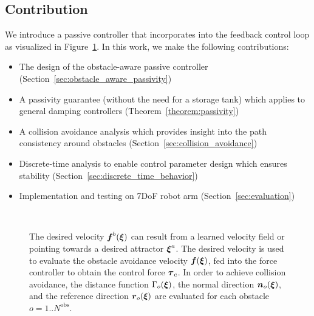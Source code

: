 \subsection{Contribution}
We introduce a passive controller that incorporates into the feedback control loop as visualized in Figure~\ref{fig:control_scheme_passive}. 
In this work, we make the following contributions:
\begin{itemize}
\item The design of the obstacle-aware passive controller
(Section~\ref{sec:obstacle_aware_passivity})
\item A passivity guarantee (without the need for a storage tank) which applies to general damping controllers (Theorem~\ref{theorem:passivity})
\ifthesis
{}
\else
\item A collision avoidance analysis which provides insight into the path consistency around obstacles (Section~\ref{sec:collision_avoidance})
\fi
\item Discrete-time analysis to enable control parameter design which ensures stability (Section~\ref{sec:discrete_time_behavior})
\item Implementation and testing on 7DoF robot arm (Section~\ref{sec:evaluation})
\end{itemize}

\ifthesis
\,
\else
\begin{figure}[thb]
  \center
  
\caption{The desired velocity $\boldsymbol{f}^b(\boldsymbol{\xi})$ can result from a learned velocity field or pointing towards a desired attractor $\boldsymbol{\xi}^a$. The desired velocity is used to evaluate the obstacle avoidance velocity $\boldsymbol{f}(\boldsymbol{\xi})$, fed into the force controller to obtain the control force $\boldsymbol{\tau}_c$. In order to achieve collision avoidance, the distance function $\Gamma_o(\boldsymbol{\xi})$, the normal direction $\boldsymbol{n}_o(\boldsymbol{\xi})$, and the reference direction $\boldsymbol{r}_o(\boldsymbol{\xi})$ are evaluated for each obstacle $o = 1 .. N^\mathrm{{obs}}$.}
\label{fig:control_scheme_passive}
\end{figure}
\fi
